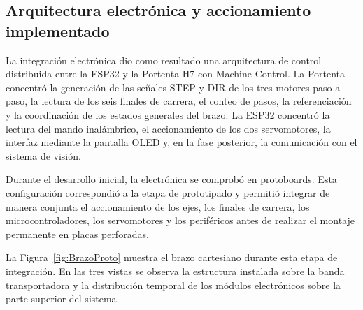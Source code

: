 \subsection{Arquitectura electrónica y accionamiento implementado}

La integración electrónica dio como resultado una arquitectura de control distribuida entre la ESP32 y la Portenta H7 con Machine Control. La Portenta concentró la generación de las señales STEP y DIR de los tres motores paso a paso, la lectura de los seis finales de carrera, el conteo de pasos, la referenciación y la coordinación de los estados generales del brazo. La ESP32 concentró la lectura del mando inalámbrico, el accionamiento de los dos servomotores, la interfaz mediante la pantalla OLED y, en la fase posterior, la comunicación con el sistema de visión.

Durante el desarrollo inicial, la electrónica se comprobó en protoboards. Esta configuración correspondió a la etapa de prototipado y permitió integrar de manera conjunta el accionamiento de los ejes, los finales de carrera, los microcontroladores, los servomotores y los periféricos antes de realizar el montaje permanente en placas perforadas.

La Figura~\ref{fig:BrazoProto} muestra el brazo cartesiano durante esta etapa de integración. En las tres vistas se observa la estructura instalada sobre la banda transportadora y la distribución temporal de los módulos electrónicos sobre la parte superior del sistema.

